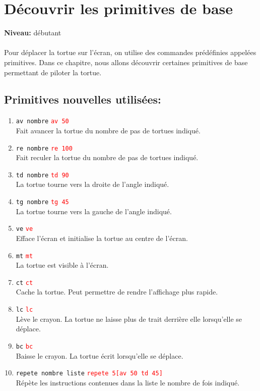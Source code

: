 \chapter{Découvrir les primitives de base}
{ }\hfill\textbf{Niveau:} débutant\\ \\
\noindent
Pour déplacer la tortue sur l'écran, on utilise des commandes prédéfinies appelées \og primitives\fg. Dans ce chapitre, nous allons découvrir certaines primitives de base permettant de piloter la tortue.
\section{Primitives nouvelles utilisées:}
\noindent \begin{enumerate}
\item  \texttt{av nombre}\hspace {4cm } \textcolor{red}{ \texttt{av 50}}\\
Fait avancer la tortue du nombre de pas de tortues indiqué.
\item  \texttt{re nombre}\hspace {4cm } \textcolor{red}{ \texttt{re 100}}\\
Fait reculer la tortue du nombre de pas de tortues indiqué.
\item  \texttt{td nombre}\hspace {4cm } \textcolor{red}{\texttt{td 90}}\\
La tortue tourne vers la droite de l'angle indiqué.
\item  \texttt{tg nombre}\hspace {4cm } \textcolor{red}{ \texttt{tg 45}}\\
La tortue tourne vers la gauche de l'angle indiqué.
\item  \texttt{ve}\hspace {4cm } \textcolor{red}{ \texttt{ve}}\\
Efface l'écran et initialise la tortue au centre de l'écran.
\item  \texttt{mt}\hspace {4cm } \textcolor{red}{ \texttt{mt}}\\
La tortue est visible à l'écran.
\item  \texttt{ct}\hspace {4cm } \textcolor{red}{ \texttt{ct}}\\
Cache la tortue. Peut permettre de rendre l'affichage plus rapide.
\item  \texttt{lc}\hspace {4cm } \textcolor{red}{ \texttt{lc}}\\
Lève le crayon. La tortue ne laisse plus de trait derrière elle lorsqu'elle se déplace.
\item  \texttt{bc}\hspace {4cm } \textcolor{red}{ \texttt{bc}}\\
Baisse le crayon. La tortue écrit lorsqu'elle se déplace.
\item  \texttt{repete nombre liste}\hspace {4cm } \textcolor{red}{ \texttt{repete 5[av 50 td 45]}}\\
Répète les instructions contenues dans la liste le nombre de fois indiqué.
\end{enumerate}
